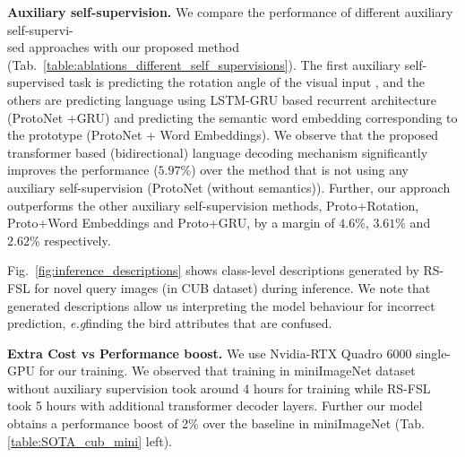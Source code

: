 \documentclass{bmvc2k}
\def\eg{\emph{e.g}\bmvaOneDot}
\begin{document}
\noindent \textbf{Auxiliary self-supervision.} We compare the performance of different auxiliary self-supervi-\\sed approaches with our proposed method (Tab.~\ref{table:ablations_different_self_supervisions}). The first auxiliary self-supervised task is predicting the rotation angle of the visual input \cite{rizve2021exploring,rajasegaran2020self}, and the others are predicting language using LSTM-GRU based recurrent architecture (ProtoNet +GRU) \cite{mu2020shaping} and predicting the semantic word embedding corresponding to the prototype (ProtoNet + Word Embeddings).  We observe that the proposed transformer based (bidirectional) language decoding mechanism significantly improves the performance ($5.97\%$) over the method that is not using any auxiliary self-supervision (ProtoNet (without semantics)). Further, our approach outperforms the other auxiliary self-supervision methods, Proto+Rotation, Proto+Word Embeddings and Proto+GRU, by a margin of $4.6\%$, $3.61\%$ and $2.62\%$ respectively.



Fig.~\ref{fig:inference_descriptions} shows class-level descriptions generated by RS-FSL for novel query images (in CUB dataset) during inference. We note that generated descriptions allow us interpreting the model behaviour for incorrect prediction, \eg finding the bird attributes that are confused.

\begin{SCtable}[][h]
\centering{}
\caption{Comparison between different auxiliary training methods. Average few-shot 5-way 1-shot accuracy reported with 95\% confidence interval}
\label{table:ablations_different_self_supervisions}
\end{SCtable}

\noindent \textbf{Extra Cost vs Performance boost.} We use Nvidia-RTX Quadro 6000 single-GPU for our training. We observed that training in miniImageNet dataset without auxiliary supervision took around 4 hours for training while RS-FSL took 5 hours with additional transformer decoder layers. Further our model obtains a performance boost of 2\% over the baseline in miniImageNet (Tab. \ref{table:SOTA_cub_mini} left).
\end{document}
